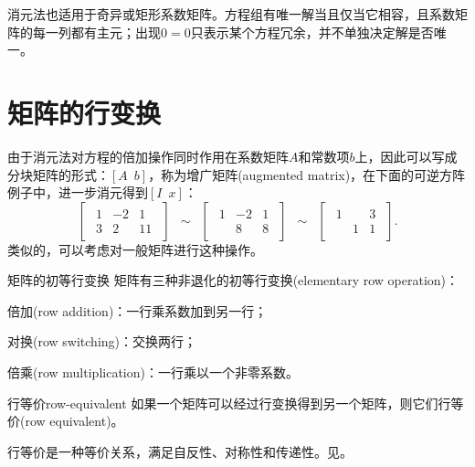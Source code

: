 \begin{remark}
	消元法也适用于奇异或矩形系数矩阵。方程组有唯一解当且仅当它相容，且系数矩阵的每一列都有主元；出现$0 = 0$只表示某个方程冗余，并不单独决定解是否唯一。
\end{remark}

\section{矩阵的行变换}

由于消元法对方程的倍加操作同时作用在系数矩阵$A$和常数项$b$上，因此可以写成分块矩阵的形式：$[A\enspace b]$，称为增广矩阵(augmented matrix)，在下面的可逆方阵例子中，进一步消元得到$[I\enspace x]$：
\[
	\begin{bmatrix}
		\begin{array}{cc|c}
			1&-2&1\\3&2&11
		\end{array}
	\end{bmatrix}
	\enspace \sim \enspace
	\begin{bmatrix}
		\begin{array}{cc|c}
			1&-2&1\\ &8&8
		\end{array}
	\end{bmatrix}
	\enspace \sim \enspace
	\begin{bmatrix}
		\begin{array}{cc|c}
			1&&3\\ &1&1
		\end{array}
	\end{bmatrix}.
\]
类似的，可以考虑对一般矩阵进行这种操作。

\begin{definition}{矩阵的初等行变换}{}
	矩阵有三种非退化的初等行变换(elementary row operation)：
	\begin{compactitem}
		\item 倍加(row addition)：一行乘系数加到另一行；
		\item 对换(row switching)：交换两行；
		\item 倍乘(row multiplication)：一行乘以一个非零系数。
	\end{compactitem}
\end{definition}

\begin{definition}{行等价}{row-equivalent}
	如果一个矩阵可以经过行变换得到另一个矩阵，则它们行等价(row equivalent)。
\end{definition}

\begin{remark}
	行等价是一种等价关系，满足自反性、对称性和传递性。见。
\end{remark}

